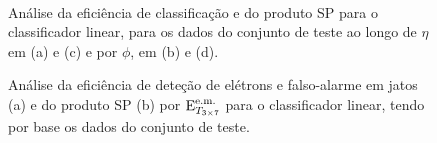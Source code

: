 \begin{figure}
\begin{center}
\mbox{%
}
\mbox{%
}
\end{center}
\caption{Análise da eficiência de classificação e do produto SP para o
classificador linear, para os dados do conjunto de teste ao longo de $\eta$ em
(a) e (c) e por $\phi$, em (b) e (d).}
\label{fig:lms-test-eta-phi}
\end{figure}

\begin{figure}
\begin{center}
\end{center}
\caption{Análise da eficiência de deteção de elétrons e falso-alarme em jatos
(a) e do produto SP (b) por $\text{E}^{\text{e.m.}}_{T_{3\times7}}$ para o classificador linear, tendo por
base os dados do conjunto de teste.}
\label{fig:lms-test-efficiency-et}
\end{figure}



